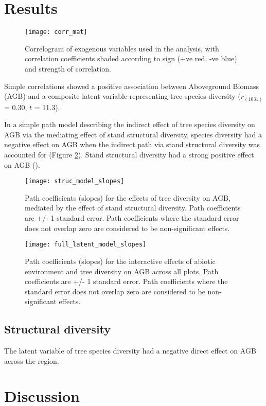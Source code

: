 \documentclass[11pt,a4paper]{article}
\begin{document}
\section{Results}

\begin{figure}[H]
\centering
	\texttt{[image: corr\_mat]}
	\caption{Correlogram of exogenous variables used in the analysis, with correlation coefficients shaded according to sign (+ve red, -ve blue) and strength of correlation.}
	\label{corr_mat}
\end{figure}

Simple correlations showed a positive association between Aboveground Biomass (AGB) and a composite latent variable representing tree species diversity ($r_{(1031)}$ = 0.30, $t$ = 11.3).

In a simple path model describing the indirect effect of tree species diversity on AGB via the mediating effect of stand structural diversity, species diversity had a negative effect on AGB when the indirect path via stand structural diversity was accounted for (Figure \ref{struc_model_slopes}). Stand structural diversity had a strong positive effect on AGB (). 

\begin{figure}[H]
\centering
	\texttt{[image: struc\_model\_slopes]}
	\caption{Path coefficients (slopes) for the effects of tree diversity on AGB, mediated by the effect of stand structural diversity. Path coefficients are +/- 1 standard error. Path coefficients where the standard error does not overlap zero are considered to be non-significant effects.}
	\label{struc_model_slopes}
\end{figure}

\begin{figure}[H]
\centering
	\texttt{[image: full\_latent\_model\_slopes]}
	\caption{Path coefficients (slopes) for the interactive effects of abiotic environment and tree diversity on AGB across all plots. Path coefficients are +/- 1 standard error. Path coefficients where the standard error does not overlap zero are considered to be non-significant effects.}
	\label{full_latent_model_slopes}
\end{figure}

\subsection{Structural diversity}

The latent variable of tree species diversity had a negative direct effect on AGB across the region. 

\section{Discussion}
\end{document}
